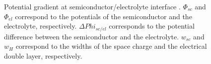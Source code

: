 \begin{figure}[h]
\centering

\caption{Potential gradient at semiconductor/electrolyte interface 
\citep{marcus2006-1}. $\Phi_{sc}$ and $\Phi_{el}$ correspond to the 
potentials of the semiconductor and the electrolyte, respectively. 
$\Delta Phi _{sc/el}$ corresponds to the potential difference between 
the semiconductor and the electrolyte. $w_{sc}$ and $w_{H}$ correspond to 
the widths of the space charge and the electrical double layer, 
respectively.}
\label{fig_interface_potential}
\end{figure}